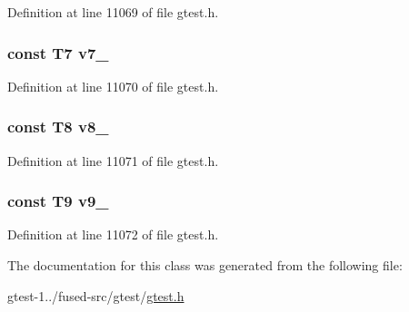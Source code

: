 \-Definition at line 11069 of file gtest.\-h.

\hypertarget{classtesting_1_1internal_1_1ValueArray16_a4063f0b7a528133d018ee488ba44a9a3}{
\subsubsection[{v7\-\_\-}]{\setlength{\rightskip}{0pt plus 5cm}const \-T7 {\bf v7\-\_\-}}}\label{d7/d7a/classtesting_1_1internal_1_1ValueArray16_a4063f0b7a528133d018ee488ba44a9a3}


\-Definition at line 11070 of file gtest.\-h.

\hypertarget{classtesting_1_1internal_1_1ValueArray16_a596bc5260b2474271d1f6910ff6f665d}{
\subsubsection[{v8\-\_\-}]{\setlength{\rightskip}{0pt plus 5cm}const \-T8 {\bf v8\-\_\-}}}\label{d7/d7a/classtesting_1_1internal_1_1ValueArray16_a596bc5260b2474271d1f6910ff6f665d}


\-Definition at line 11071 of file gtest.\-h.

\hypertarget{classtesting_1_1internal_1_1ValueArray16_a6356e16cf54a9dfac8525f20242af31e}{
\subsubsection[{v9\-\_\-}]{\setlength{\rightskip}{0pt plus 5cm}const \-T9 {\bf v9\-\_\-}}}\label{d7/d7a/classtesting_1_1internal_1_1ValueArray16_a6356e16cf54a9dfac8525f20242af31e}


\-Definition at line 11072 of file gtest.\-h.



\-The documentation for this class was generated from the following file\-:\begin{DoxyCompactItemize}
\item 
gtest-\/1../fused-\/src/gtest/\hyperlink{fused-src_2gtest_2gtest_8h}{gtest.\-h}\end{DoxyCompactItemize}
